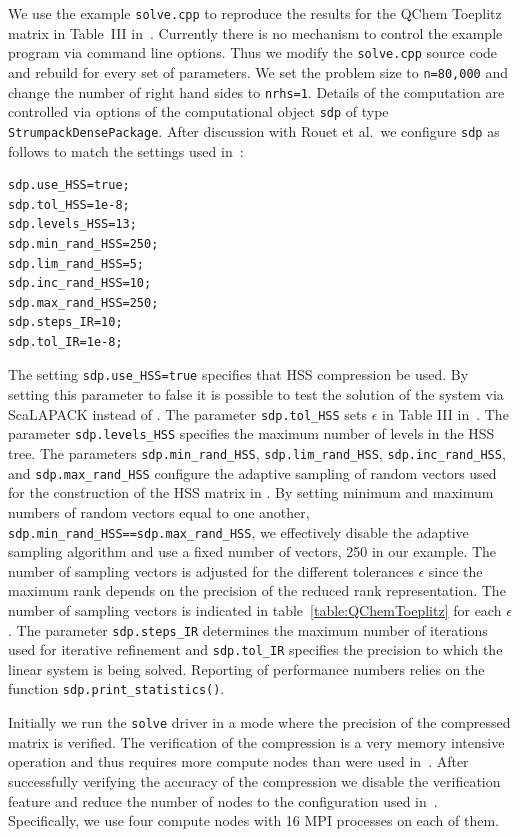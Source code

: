\documentclass{acmsmall}
\begin{document}
We use the example \verb!solve.cpp! to reproduce the results for
the QChem Toeplitz matrix in Table~III in~\cite{rouet:strumpack}.
Currently there is no mechanism to control the example program
via command line options.  Thus we modify the \verb!solve.cpp!
source code and rebuild for every set of parameters.  We set the
problem size to \verb!n=80,000! and change the number of right
hand sides to \verb!nrhs=1!.  Details of the computation are
controlled via options of the computational object \verb!sdp! of
type \verb!StrumpackDensePackage!.  After discussion with Rouet
et al.\ we configure \verb!sdp! as follows to match the settings
used in~\cite{rouet:strumpack}:
\begin{verbatim}
sdp.use_HSS=true;
sdp.tol_HSS=1e-8;
sdp.levels_HSS=13;
sdp.min_rand_HSS=250;
sdp.lim_rand_HSS=5;
sdp.inc_rand_HSS=10;
sdp.max_rand_HSS=250;
sdp.steps_IR=10;
sdp.tol_IR=1e-8;
\end{verbatim}
The setting \verb!sdp.use_HSS=true! specifies that HSS
compression be used.  By setting this parameter to false it is
possible to test the solution of the system via ScaLAPACK instead
of \strumpack{}.  The parameter \verb!sdp.tol_HSS! sets
$\epsilon$ in Table III in~\cite{rouet:strumpack}.  The parameter
\verb!sdp.levels_HSS! specifies the maximum number of levels in
the HSS tree.  The parameters \verb!sdp.min_rand_HSS!,
\verb!sdp.lim_rand_HSS!, \verb!sdp.inc_rand_HSS!, and
\verb!sdp.max_rand_HSS! configure the adaptive sampling of random
vectors used for the construction of the HSS matrix in
\strumpack{}.  By setting minimum and maximum numbers of random
vectors equal to one another,
\verb!sdp.min_rand_HSS==sdp.max_rand_HSS!, we effectively disable
the adaptive sampling algorithm and use a fixed number of
vectors, 250 in our example.  The number of sampling vectors is
adjusted for the different tolerances $\epsilon$ since the
maximum rank depends on the precision of the reduced rank
representation.  The number of sampling vectors is indicated in
table~\ref{table:QChemToeplitz} for each $\epsilon$.  The
parameter \verb!sdp.steps_IR! determines the maximum number of
iterations used for iterative refinement and \verb!sdp.tol_IR!
specifies the precision to which the linear system is being
solved.  Reporting of performance numbers relies on the function
\verb!sdp.print_statistics()!.

Initially we run the \verb!solve! driver in a mode where the
precision of the compressed matrix is verified.  The verification
of the compression is a very memory intensive operation and thus
requires more compute nodes than were used
in~\cite{rouet:strumpack}.  After successfully verifying the
accuracy of the compression we disable the verification feature
and reduce the number of nodes to the configuration used
in~\cite{rouet:strumpack}.  Specifically, we use four compute
nodes with 16 MPI processes on each of them.
\end{document}
